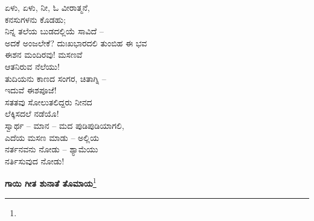 ಏಳು, ಏಳು, ನೀ, ಓ ವೀರಾತ್ಮನೆ,\\ಕನಸುಗಳನು ಕೊಡಹು;\\ನಿನ್ನ ತಲೆಯ ಬುಡದಲ್ಲಿಯೆ ಸಾವಿದೆ –\\ಅದಕೆ ಅಂಜಲೇಕೆ? ದುಃಖಭಾರದಲಿ ತುಂಬಿಹ ಈ ಭವ\\ಈಶನ ಮಂದಿರವು! ಮಸಣವೆ\\ಆತನಿರುವ ನೆಲೆಯು!\\ತುದಿಯನು ಕಾಣದ ಸಂಗರ, ಚಿತಾಗ್ನಿ –\\ಇದುವೆ ಈಶಪೂಜೆ!\\ಸತತವು ಸೋಲುತಲಿದ್ದರು ನೀನದ\\ಲೆಕ್ಕಿಸದಲೆ ನಡೆಯೊ!\\ಸ್ವಾರ್ಥ – ಮಾನ – ಮದ ಪುಡಿಪುಡಿಯಾಗಲಿ,\\ಎದೆಯ ಮಸಣ ಮಾಡು – ಅಲ್ಲಿಯ\\ನರ್ತನವನು ನೋಡು – ಶ್ಯಾಮೆಯು\\ನರ್ತಿಸುವುದ ನೋಡು!

\begin{center}
\textbf{ಗಾಯಿ ಗೀತ ಶುನಾತೆ ತೊಮಾಯ}\footnote{}
\end{center}

